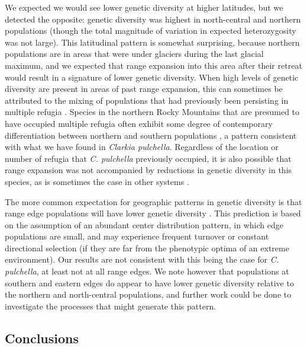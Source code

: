 \documentclass{article}
\begin{document}
We expected we would see lower genetic diversity at higher latitudes, but we detected the opposite: genetic diversity was highest in north-central and northern populations (though the total magnitude of variation in expected heterozygosity was not large). This latitudinal pattern is somewhat surprising, because northern populations are in areas that were under glaciers during the last glacial maximum, and we expected that range expansion into this area after their retreat would result in a signature of lower genetic diversity. When high levels of genetic diversity are present in areas of past range expansion, this can sometimes be attributed to the mixing of populations that had previously been persisting in multiple refugia \citep{petit2003glacial, brunsfeld2005multi}. Species in the northern Rocky Mountains that are presumed to have occupied multiple refugia often exhibit some degree of contemporary differentiation between northern and southern populations \citep{brunsfeld2001comparative, brunsfeld2005multi}, a pattern consistent with what we have found in \textit{Clarkia pulchella}. Regardless of the location or number of refugia that \textit{C. pulchella} previously occupied, it is also possible that range expansion was not accompanied by reductions in genetic diversity in this species, as is sometimes the case in other systems \citep{vandepitte2017retention}.

The more common expectation for geographic patterns in genetic diversity is that range edge populations will have lower genetic diversity \citep{vucetich2003spatial}. This prediction is based on the assumption of an abundant center distribution pattern, in which edge populations are small, and may experience frequent turnover or constant directional selection (if they are far from the phenotypic optima of an extreme environment). Our results are not consistent with this being the case for \textit{C. pulchella}, at least not at all range edges. We note however that populations at southern and eastern edges do appear to have lower genetic diversity relative to the northern and north-central populations, and further work could be done to investigate the processes that might generate this pattern.  

\subsection*{Conclusions}
\end{document}
